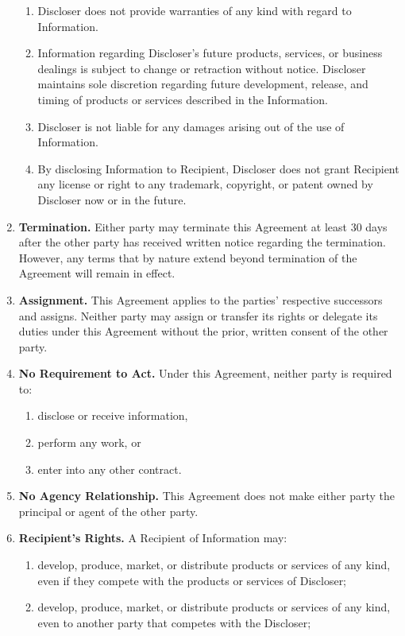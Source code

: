 \documentclass[12pt]{article}
\begin{document}
\begin{enumerate}
    \begin{enumerate}\itemsep2pt
      \item Discloser does not provide warranties of any kind with regard to Information.
      \item Information regarding Discloser's future products, services, or business dealings is subject to change or retraction without notice. Discloser maintains sole discretion regarding future development, release, and timing of products or services described in the Information.
      \item Discloser is not liable for any damages arising out of the use of Information.
      \item By disclosing Information to Recipient, Discloser does not grant Recipient any license or right to any trademark, copyright, or patent owned by Discloser now or in the future.
    \end{enumerate}
  \item {\bf Termination.} Either party may terminate this Agreement at least 30 days after the other party has received written notice regarding the termination. However, any terms that by nature extend beyond termination of the Agreement will remain in effect.
  \item {\bf Assignment.} This Agreement applies to the parties' respective successors and assigns. Neither party may assign or transfer its rights or delegate its duties under this Agreement without the prior, written consent of the other party.
  \item {\bf No Requirement to Act.} Under this Agreement, neither party is required to:
    \begin{enumerate}\itemsep2pt
      \item disclose or receive information,
      \item perform any work, or
      \item enter into any other contract.
    \end{enumerate}
  \item {\bf No Agency Relationship.} This Agreement does not make either party the principal or agent of the other party.
  \item {\bf Recipient's Rights.} A Recipient of Information may:
    \begin{enumerate}\itemsep2pt
      \item develop, produce, market, or distribute products or services of any kind, even if they compete with the products or services of Discloser;
      \item develop, produce, market, or distribute products or services of any kind, even to another party that competes with the Discloser;

\end{enumerate}
\end{enumerate}
\end{document}

